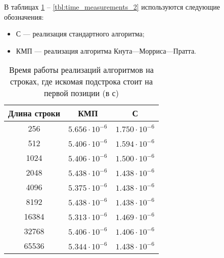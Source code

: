 В таблицах \ref{tbl:time_measurements} -- \ref{tbl:time_measurements_2} используются следующие обозначения: 
\begin{itemize}
	\item С --- реализация стандартного алгоритма;
	\item КМП --- реализация алгоритма Кнута---Морриса---Пратта.
\end{itemize}

\begin{table}[h]
	\begin{center}
		\begin{threeparttable}
			\captionsetup{justification=raggedright,singlelinecheck=off}
			\caption{Время работы реализаций алгоритмов на строках, где искомая подстрока стоит на первой позиции (в с)}
			\label{tbl:time_measurements}
			\begin{tabular}{|c|c|c|}
				\hline
				Длина строки &  КМП  & С \\
				\hline
				256 &$ 5.656\cdot 10^{-6} $&$ 1.750\cdot 10^{-6}$\\
				\hline
				512 &$ 5.406\cdot 10^{-6} $&$ 1.594\cdot 10^{-6}$\\
				\hline
				1024 &$ 5.406\cdot 10^{-6} $&$ 1.500\cdot 10^{-6}$\\
				\hline
				2048 &$ 5.438\cdot 10^{-6} $&$ 1.438\cdot 10^{-6}$\\
				\hline
				4096 &$ 5.375\cdot 10^{-6} $&$ 1.438\cdot 10^{-6}$\\
				\hline
				8192 &$ 5.438\cdot 10^{-6} $&$ 1.438\cdot 10^{-6}$\\
				\hline
				16384 &$ 5.313\cdot 10^{-6} $&$ 1.469\cdot 10^{-6}$\\
				\hline
				32768 &$ 5.406\cdot 10^{-6} $&$ 1.406\cdot 10^{-6}$\\
				\hline
				65536 &$ 5.344\cdot 10^{-6} $&$ 1.438\cdot 10^{-6}$\\
				\hline
			\end{tabular}
		\end{threeparttable}
	\end{center}
\end{table}

